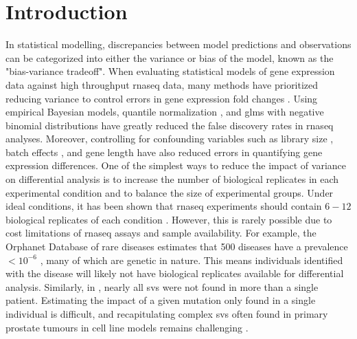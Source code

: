 \section{Introduction}

In statistical modelling, discrepancies between model predictions and observations can be categorized into either the variance or bias of the model, known as the "bias-variance tradeoff".
When evaluating statistical models of gene expression data against high throughput \gls{rnaseq} data, many methods have prioritized reducing variance to control errors in gene expression fold changes \cite{robinsonEdgeRBioconductorPackage2010,loveModeratedEstimationFold2014,hansenRemovingTechnicalVariability2012,trapnellDifferentialAnalysisGene2013,liRSEMAccurateTranscript2011,hardcastleBaySeqEmpiricalBayesian2010,ritchieLimmaPowersDifferential2015,lawVoomPrecisionWeights2014,lengEBSeqEmpiricalBayes2013,liModelingAnalysisRNAseq2018,rissoNormalizationRNAseqData2014,bullardEvaluationStatisticalMethods2010,pimentelDifferentialAnalysisRNAseq2017,yiGenelevelDifferentialAnalysis2018}.
Using empirical Bayesian \cite{hardcastleBaySeqEmpiricalBayesian2010,lengEBSeqEmpiricalBayes2013} models, quantile normalization \cite{hansenRemovingTechnicalVariability2012}, and \glspl{glm} with negative binomial distributions have greatly reduced the false discovery rates in \gls{rnaseq} analyses.
Moreover, controlling for confounding variables such as library size \cite{bullardEvaluationStatisticalMethods2010}, batch effects \cite{leekSvaPackageRemoving2012}, and gene length \cite{bullardEvaluationStatisticalMethods2010,loveModeratedEstimationFold2014,robinsonEdgeRBioconductorPackage2010,oshlackTranscriptLengthBias2009} have also reduced errors in quantifying gene expression differences.
One of the simplest ways to reduce the impact of variance on differential analysis is to increase the number of biological replicates in each experimental condition and to  balance the size of experimental groups.
Under ideal conditions, it has been shown that \gls{rnaseq} experiments should contain $6-12$ biological replicates of each condition \cite{schurchHowManyBiological2016}.
However, this is rarely possible due to cost limitations of \gls{rnaseq} assays and sample availability.
For example, the Orphanet Database of rare diseases estimates that  500 diseases have a prevalence $< 10^{-6}$ \cite{nguengangwakapEstimatingCumulativePoint2020}, many of which are genetic in nature.
This means individuals identified with the disease will likely not have biological replicates available for differential analysis.
Similarly, in , nearly all \glspl{sv} were not found in more than a single patient.
Estimating the impact of a given mutation only found in a single individual is difficult, and recapitulating complex \glspl{sv} often found in primary prostate tumours in cell line models remains challenging \cite{nakamuraCRISPRTechnologiesPrecise2021,pickar-oliverNextGenerationCRISPR2019,wangEngineering3DGenome2021}.

